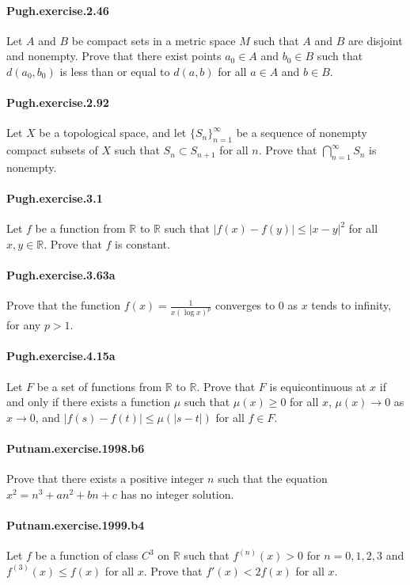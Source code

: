 \documentclass{article}
\begin{document}
\paragraph{Pugh.exercise.2.46} Let $A$ and $B$ be compact sets in a metric space $M$ such that $A$ and $B$ are disjoint and nonempty. Prove that there exist points $a_0\in A$ and $b_0\in B$ such that $d(a_0, b_0)$ is less than or equal to $d(a, b)$ for all $a\in A$ and $b\in B$.

\paragraph{Pugh.exercise.2.92} Let $X$ be a topological space, and let $\{S_n\}_{n=1}^\infty$ be a sequence of nonempty compact subsets of $X$ such that $S_n\subset S_{n+1}$ for all $n$. Prove that $\bigcap_{n=1}^\infty S_n$ is nonempty.

\paragraph{Pugh.exercise.3.1} Let $f$ be a function from $\mathbb{R}$ to $\mathbb{R}$ such that $|f(x)-f(y)|\leq |x-y|^2$ for all $x, y\in\mathbb{R}$. Prove that $f$ is constant.

\paragraph{Pugh.exercise.3.63a} Prove that the function $f(x)=\frac{1}{x(\log x)^p}$ converges to $0$ as $x$ tends to infinity, for any $p>1$.

\paragraph{Pugh.exercise.4.15a} Let $F$ be a set of functions from $\mathbb{R}$ to $\mathbb{R}$. Prove that $F$ is equicontinuous at $x$ if and only if there exists a function $\mu$ such that $\mu(x)\geq 0$ for all $x$, $\mu(x)\to 0$ as $x\to 0$, and $|f(s)-f(t)|\leq \mu(|s-t|)$ for all $f\in F$.

\paragraph{Putnam.exercise.1998.b6} Prove that there exists a positive integer $n$ such that the equation $x^2=n^3+an^2+bn+c$ has no integer solution.

\paragraph{Putnam.exercise.1999.b4} Let $f$ be a function of class $C^3$ on $\mathbb{R}$ such that $f^{(n)}(x)>0$ for $n=0, 1, 2, 3$ and $f^{(3)}(x)\leq f(x)$ for all $x$. Prove that $f'(x)<2f(x)$ for all $x$.
\end{document}
